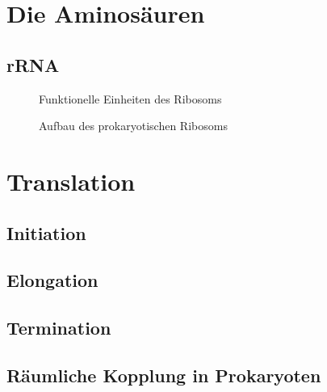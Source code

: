 \section{Die Aminosäuren}\label{sec:die-aminosauren}

\subsection{rRNA}\label{subsec:rrna}
\begin{figure}
    \caption{Funktionelle Einheiten des Ribosoms}\label{fig:figure10}
\end{figure}



\begin{figure}
    \caption{Aufbau des
    prokaryotischen Ribosoms}\label{fig:figure9}
\end{figure}


\section{Translation}\label{sec:translation}
\subsection{Initiation}\label{subsec:initiation}
\subsection{Elongation}\label{subsec:elongation}
\subsection{Termination}\label{subsec:termination}


\subsection{Räumliche Kopplung in Prokaryoten}\label{subsec:raumliche-kopplung-in-prokaryoten}
